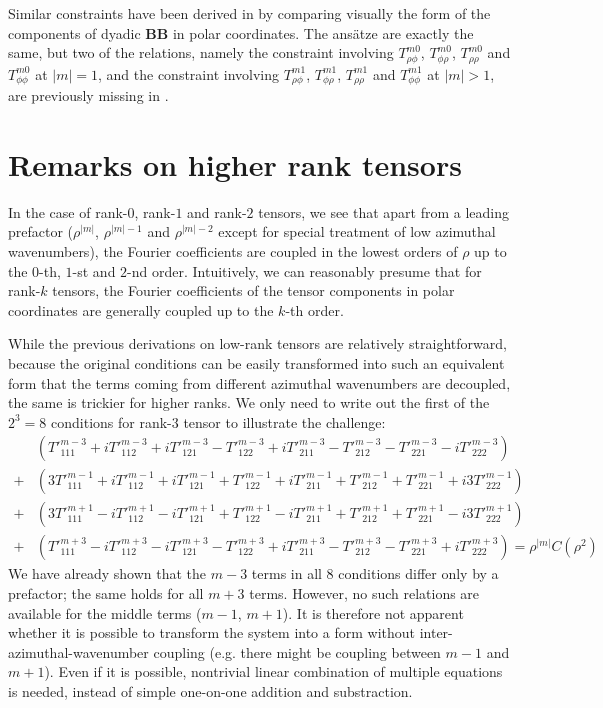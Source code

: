 \documentclass[a4paper, 11pt]{article}
\begin{document}
Similar constraints have been derived in \textcite{holdenried-chernoff_long_2021} by comparing visually the form of the components of dyadic $\mathbf{B}\mathbf{B}$ in polar coordinates. The ansätze are exactly the same, but two of the relations, namely the constraint involving $T_{\rho\phi}^{m0}$, $T_{\phi\rho}^{m0}$, $T_{\rho\rho}^{m0}$ and $T_{\phi\phi}^{m0}$ at $|m|=1$, and the constraint involving $T_{\rho\phi}^{m1}$, $T_{\phi\rho}^{m1}$, $T_{\rho\rho}^{m1}$ and $T_{\phi\phi}^{m1}$ at $|m|>1$, are previously missing in \textcite{holdenried-chernoff_long_2021}.


\section{Remarks on higher rank tensors}

In the case of rank-$0$, rank-$1$ and rank-$2$ tensors, we see that apart from a leading prefactor ($\rho^{|m|}$, $\rho^{|m|-1}$ and $\rho^{|m|-2}$ except for special treatment of low azimuthal wavenumbers), the Fourier coefficients are coupled in the lowest orders of $\rho$ up to the $0$-th, $1$-st and $2$-nd order. Intuitively, we can reasonably presume that for rank-$k$ tensors, the Fourier coefficients of the tensor components in polar coordinates are generally coupled up to the $k$-th order.

While the previous derivations on low-rank tensors are relatively straightforward, because the original conditions can be easily transformed into such an equivalent form that the terms coming from different azimuthal wavenumbers are decoupled, the same is trickier for higher ranks. We only need to write out the first of the $2^3 = 8$ conditions for rank-$3$ tensor to illustrate the challenge:
\[\begin{aligned}
    &\left(T'^{m-3}_{111} + iT'^{m-3}_{112} + iT'^{m-3}_{121} - T'^{m-3}_{122} + i T'^{m-3}_{211} - T'^{m-3}_{212} - T'^{m-3}_{221} - i T'^{m-3}_{222}\right) \\ 
    +& \left(3T'^{m-1}_{111} + iT'^{m-1}_{112} + iT'^{m-1}_{121} + T'^{m-1}_{122} + i T'^{m-1}_{211} + T'^{m-1}_{212} + T'^{m-1}_{221} + i3 T'^{m-1}_{222}\right) \\ 
    +& \left(3T'^{m+1}_{111} - iT'^{m+1}_{112} - iT'^{m+1}_{121} + T'^{m+1}_{122} - i T'^{m+1}_{211} + T'^{m+1}_{212} + T'^{m+1}_{221} - i3 T'^{m+1}_{222}\right) \\ 
    +&\left(T'^{m+3}_{111} - iT'^{m+3}_{112} - iT'^{m+3}_{121} - T'^{m+3}_{122} + i T'^{m+3}_{211} - T'^{m+3}_{212} - T'^{m+3}_{221} + i T'^{m+3}_{222}\right) = \rho^{|m|} C(\rho^2)
\end{aligned}\]
We have already shown that the $m-3$ terms in all $8$ conditions differ only by a prefactor; the same holds for all $m+3$ terms. However, no such relations are available for the middle terms ($m-1$, $m+1$). It is therefore not apparent whether it is possible to transform the system into a form without inter-azimuthal-wavenumber coupling (e.g. there might be coupling between $m-1$ and $m+1$). Even if it is possible, nontrivial linear combination of multiple equations is needed, instead of simple one-on-one addition and substraction.
\end{document}
